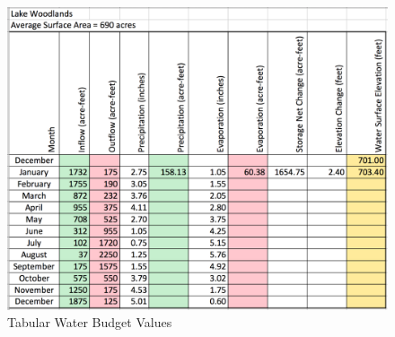 \documentclass[12pt]{article}
\begin{document}
\begin{enumerate}
\begin{figure}[h!] %
   \centering
   \includegraphics[width=6in]{Reservior.pdf} 
   \caption{Tabular Water Budget Values}
   \label{fig:reservoir}
\end{figure}



\end{enumerate}
\end{document}
